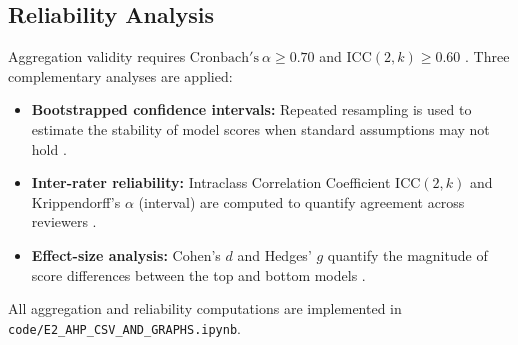 \subsection{Reliability Analysis}
\label{subsec:meth-reliability}

Aggregation validity requires $\mathrm{Cronbach's}\ \alpha \ge 0.70$ and
$\mathrm{ICC}(2, k) \ge 0.60$ \citep{hayes2007answering}. Three complementary
analyses are applied:

\begin{itemize}
  \item \textbf{Bootstrapped confidence intervals:} Repeated resampling is used to
    estimate the stability of model scores when standard assumptions may not hold
    \citep{zapf2016measuring}.
  \item \textbf{Inter-rater reliability:} Intraclass Correlation Coefficient
    $\mathrm{ICC}(2,k)$ and Krippendorff's $\alpha$ (interval) are computed to
    quantify agreement across reviewers \citep{saal1980rating, hayes2007answering}.
  \item \textbf{Effect-size analysis:} Cohen's $d$ and Hedges' $g$ quantify the
    magnitude of score differences between the top and bottom models
    \citep{steiger2004beyond}.
\end{itemize}

All aggregation and reliability computations are implemented in
\texttt{code/E2\_AHP\_CSV\_AND\_GRAPHS.ipynb}.
